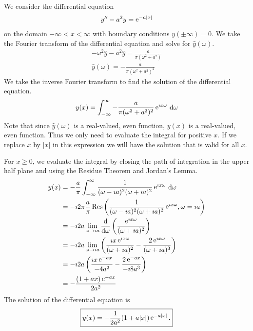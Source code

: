 {%
\begin{Solution}
  \label{solution ode ft y-a2y=e-ax}
  We consider the differential equation
  \[
  y'' - a^2 y = \mathop{\mathrm{e}}\nolimits^{-a |x|}
  \]
  on the domain $-\infty < x < \infty$ with boundary conditions 
  $y(\pm \infty) = 0$.  We take the Fourier transform of the differential
  equation and solve for $\hat{y}(\omega)$.
  \begin{gather*}
    -\omega^2 \hat{y} - a^2 \hat{y} = \frac{a}{\pi ( \omega^2 + a^2 )} 
    \\
    \hat{y}(\omega) = - \frac{a}{\pi(\omega^2 + a^2)^2}
  \end{gather*}
  We take the inverse Fourier transform to find the solution of the 
  differential equation.  
  \[
  y(x) = \int_{-\infty}^\infty - \frac{a}{\pi(\omega^2 + a^2)^2} \mathop{\mathrm{e}}\nolimits^{\imath x \omega} \,\mathrm{d} \omega
  \]
  Note that since $\hat{y}(\omega)$ is a real-valued, even function, $y(x)$
  is a real-valued, even function.  Thus we only need to evaluate the
  integral for positive $x$.  If we replace $x$ by $|x|$ in this expression
  we will have the solution that is valid for all $x$. 

  For $x \geq 0$, we evaluate the integral by closing the path of integration 
  in the upper half plane and using the Residue Theorem and Jordan's Lemma.
  \begin{align*}
    y(x) 
    &= - \frac{a}{\pi} \int_{-\infty}^\infty \frac{1}{(\omega - \imath a)^2 (\omega + \imath a)^2} \mathop{\mathrm{e}}\nolimits^{\imath x \omega} \,\mathrm{d} \omega 
    \\
    &= - \imath 2 \pi \frac{a}{\pi} \mathop{\mathrm{Res}}\nolimits \left( \frac{1}{(\omega - \imath a)^2 
        (\omega + \imath a)^2} \mathop{\mathrm{e}}\nolimits^{\imath x \omega}, \omega = \imath a \right) 
    \\
    &= - \imath 2 a \lim_{\omega \to \imath a} \frac{\mathrm{d}}{\mathrm{d} \omega} 
    \left( \frac{ \mathop{\mathrm{e}}\nolimits^{\imath x \omega} }{(\omega + \imath a)^2} \right) 
    \\
    &= - \imath 2 a \lim_{\omega \to \imath a} \left( \frac{ \imath x \mathop{\mathrm{e}}\nolimits^{\imath x \omega} }{(\omega + \imath a)^2}
      - \frac{ 2 \mathop{\mathrm{e}}\nolimits^{\imath x \omega} }{(\omega + \imath a)^3} \right) 
    \\
    &= - \imath 2 a \left( \frac{ \imath x \mathop{\mathrm{e}}\nolimits^{-a x} }{-4 a^2}
      - \frac{ 2 \mathop{\mathrm{e}}\nolimits^{-a x} }{-\imath 8 a^3} \right) 
    \\
    &= - \frac{ (1 + a x) \mathop{\mathrm{e}}\nolimits^{-a x} }{2 a^2}
  \end{align*}
  The solution of the differential equation is
  \[
  \boxed{
    y(x) = - \frac{1}{2 a^2} (1 + a |x|) \mathop{\mathrm{e}}\nolimits^{-a |x|}.
    }
  \]
\end{Solution}








}
